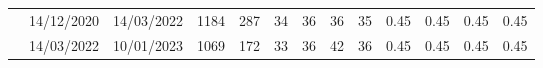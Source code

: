 \begin{table}[]
\begin{tabular}{|c|cc|cc|cccc|cccc|}
                                      & \multicolumn{1}{c|}{14/12/2020}          & 14/03/2022        & \multicolumn{1}{c|}{1184}           & 287           & \multicolumn{1}{c|}{34}     & \multicolumn{1}{c|}{36}     & \multicolumn{1}{c|}{36}     & 35     & \multicolumn{1}{c|}{0.45}   & \multicolumn{1}{c|}{0.45}   & \multicolumn{1}{c|}{0.45}   & 0.45   \\ \cline{2-13} 
                                      & \multicolumn{1}{c|}{14/03/2022}          & 10/01/2023        & \multicolumn{1}{c|}{1069}           & 172           & \multicolumn{1}{c|}{33}     & \multicolumn{1}{c|}{36}     & \multicolumn{1}{c|}{42}     & 36     & \multicolumn{1}{c|}{0.45}   & \multicolumn{1}{c|}{0.45}   & \multicolumn{1}{c|}{0.45}   & 0.45   \\ \hline
\end{tabular}
\end{table}
